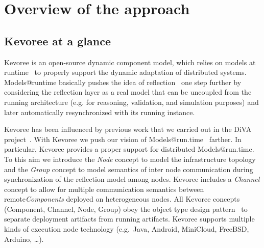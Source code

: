 \section{Overview of the approach}


\subsection{Kevoree at a glance}
\noindent Kevoree is an open-source dynamic component model, which relies on models at runtime~\cite{BlairBF09} to properly support the dynamic adaptation of distributed systems. Models@runtime basically pushes the idea of reflection~\cite{morin09a} one step further by considering the reflection layer as a real model that can be uncoupled from the running architecture (e.g. for reasoning, validation, and simulation purposes) and later automatically resynchronized with its running
instance. 


 Kevoree has been influenced by previous work that we carried out in the DiVA project~\cite{morin09a}.
With Kevoree we push our vision of Models@run.time~\cite{morin09f} farther.  
In particular, Kevoree provides a proper support for distributed Models@run.time. 
To this aim we introduce the \emph{Node} concept to model the infrastructure topology and the \emph{Group} concept to model semantics of inter node communication during synchronization of the reflection model among nodes.
Kevoree includes a \emph{Channel} concept to allow for multiple communication semantics between remote\emph{Components} deployed on heterogeneous nodes. 
All Kevoree concepts (Component, Channel, Node, Group) obey the object type design pattern~\cite{johnson_type_1997} to separate deployment artifacts from running artifacts.  
Kevoree supports multiple kinds of execution node technology (e.g.~Java, Android, MiniCloud, FreeBSD, Arduino, \dots{}). 


